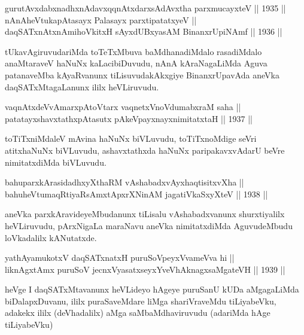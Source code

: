 \begin{shl}
gurutAvxdabxnadhxnAdavxqqnAtxdarxsAdAvx\s tha parxmucayxteV \hfill || 1935 ||\\
nAnAheVtukapAtasayx Palasayx parxtipatatxyeV ||  \\
daqSATxnAtxnAmihoVkitxH sAyxdUBxyasAM BinanxrUpiNAmf \hfill || 1936 ||
  
\end{shl}

\begin{artha}
tUkavAgiruvudariMda toTeTxMbuva baMdhanadiMdalo rasadiMdalo
anaMtaraveV haNuNx kaLacibiDuvudu, nAnA kAraNagaLiMda Aguva
patanaveMba kAyaRvanunx tiLisuvudakAkxgiye BinanxrUpavAda aneVka
daqSATxMtagaLanunx ililx heVLiruvudu.
\end{artha}

\begin{shl}
vaqnAtxdeVvA\s \s marxpAtoV\s tarx vaqnetxVnoVdumabxraM saha ||  \\
patatayxshavxtathxpAtasutx pAkeV\s payxnayxnimitatxtaH \hfill || 1937 ||
  
\end{shl}

\begin{artha}
toTiTxniMdaleV mAvina haNuNx biVLuvudu, toTiTxnoMdige seVri atitxhaNuNx
biVLuvudu, ashavxtathxda haNuNx paripakavxvAdarU beVre nimitatxdiMda
biVLuvudu.
\end{artha}

\begin{shl}
bahuparxkArasidadhxyXthaRM vAshabadxvAyxhaqtisitxvXha ||  \\
bahuheVtumaqRtiyaRsAmxtApxrXNinAM jagatiVkaSxyXteV \hfill || 1938 ||
  
\end{shl}

\begin{artha}
aneVka parxkAravideyeMbudanunx tiLisalu vAshabadxvanunx shurxtiyalilx
heVLiruvudu, pArxNigaLa maraNavu aneVka nimitatxdiMda AguvudeMbudu
loVkadalilx kANutatxde.
\end{artha}

\begin{shl}
yathA\s yamukotxV daqSATxnatxH puruSoV\s peyxVvameVva hi ||  \\
liknAgxtAmx puruSoV jecnxVyasatxseyxYveVhAknagxsaMgateVH \hfill || 1939 ||
  
\end{shl}

\begin{artha}
heVge I daqSATxMtavanunx heVLideyo hAgeye puruSanU kUDa aMgagaLiMda
biDalapxDuvanu, ililx puraSaveMdare liMga shariVraveMdu tiLiyabeVku,
adakekx ililx (deVhadalilx) aMga saMbaMdhaviruvudu (adariMda hAge tiLiyabeVku)
\end{artha}

